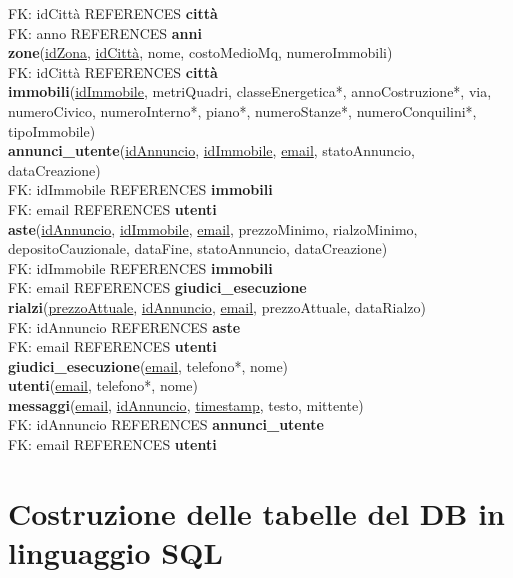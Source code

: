 \documentclass[a4paper,12pt]{report}
\begin{document}
            \null\quad\quad FK: idCittà REFERENCES \textbf{città} \\
            \null\quad\quad FK: anno REFERENCES \textbf{anni} \\
        \textbf{zone}(\underline{idZona}, \underline{idCittà}, nome, costoMedioMq, numeroImmobili) \\
            \null\quad\quad FK: idCittà REFERENCES \textbf{città} \\
        \textbf{immobili}(\underline{idImmobile}, metriQuadri, classeEnergetica*, annoCostruzione*, via, numeroCivico, numeroInterno*, piano*, numeroStanze*, numeroConquilini*, tipoImmobile) \\
        \textbf{annunci\_utente}(\underline{idAnnuncio}, \underline{idImmobile}, \underline{email}, statoAnnuncio, dataCreazione) \\
            \null\quad\quad FK: idImmobile REFERENCES \textbf{immobili} \\
            \null\quad\quad FK: email REFERENCES \textbf{utenti} \\
        \textbf{aste}(\underline{idAnnuncio}, \underline{idImmobile}, \underline{email}, prezzoMinimo, rialzoMinimo, depositoCauzionale, dataFine, statoAnnuncio, dataCreazione) \\
            \null\quad\quad FK: idImmobile REFERENCES \textbf{immobili} \\
            \null\quad\quad FK: email REFERENCES \textbf{giudici\_esecuzione} \\
        \textbf{rialzi}(\underline{prezzoAttuale}, \underline{idAnnuncio}, \underline{email}, prezzoAttuale, dataRialzo) \\
            \null\quad\quad FK: idAnnuncio REFERENCES \textbf{aste} \\
            \null\quad\quad FK: email REFERENCES \textbf{utenti} \\
        \textbf{giudici\_esecuzione}(\underline{email}, telefono*, nome) \\
        \textbf{utenti}(\underline{email}, telefono*, nome) \\
        \textbf{messaggi}(\underline{email}, \underline{idAnnuncio}, \underline{timestamp}, testo, mittente) \\
            \null\quad\quad FK: idAnnuncio REFERENCES \textbf{annunci\_utente} \\
            \null\quad\quad FK: email REFERENCES \textbf{utenti} \\
        	

            \section{Costruzione delle tabelle del DB in linguaggio SQL}
\end{document}
